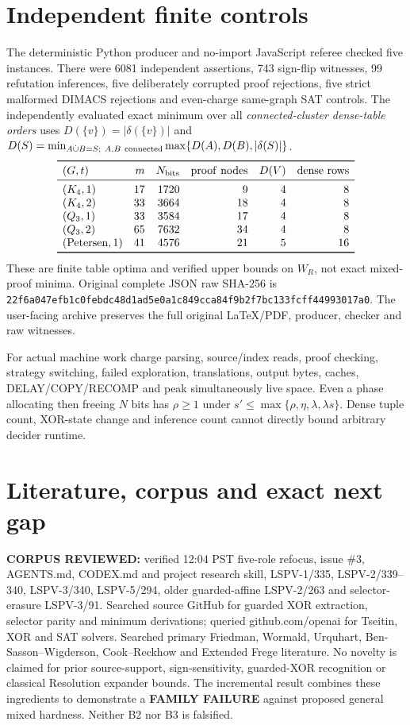 \documentclass[11pt]{article}
\begin{document}
\section{Independent finite controls}
The deterministic Python producer and no-import JavaScript referee checked five instances. There were 6081 independent assertions, 743 sign-flip witnesses, 99 refutation inferences, five deliberately corrupted proof rejections, five strict malformed DIMACS rejections and even-charge same-graph SAT controls. The independently evaluated exact minimum over all \emph{connected-cluster dense-table orders} uses
$D(\{v\})=|\delta(\{v\})|$ and
$D(S)=\min_{A\dot\cup B=S;\ A,B\ {\rm connected}}\max\{D(A),D(B),|\delta(S)|\}$.
\[
\begin{array}{lrrrrr}\toprule
(G,t)&m&N_{\mathrm{bits}}&\mathrm{proof\ nodes}&D(V)&\mathrm{dense\ rows}\\\midrule
(K_4,1)&17&1720&9&4&8\\
(K_4,2)&33&3664&18&4&8\\
(Q_3,1)&33&3584&17&4&8\\
(Q_3,2)&65&7632&34&4&8\\
(\mathrm{Petersen},1)&41&4576&21&5&16\\\bottomrule
\end{array}
\]
These are finite table optima and verified upper bounds on $W_R$, not exact mixed-proof minima. Original complete JSON raw SHA-256 is \texttt{22f6a047efb1c0febdc48d1ad5e0a1c849cca84f9b2f7bc133fcff44993017a0}. The user-facing archive preserves the full original LaTeX/PDF, producer, checker and raw witnesses.

For actual machine work charge parsing, source/index reads, proof checking, strategy switching, failed exploration, translations, output bytes, caches, DELAY/COPY/RECOMP and peak simultaneously live space. Even a phase allocating then freeing $N$ bits has $\rho\ge1$ under $s'\le\max\{\rho,\eta,\lambda,\lambda s\}$. Dense tuple count, XOR-state change and inference count cannot directly bound arbitrary decider runtime.

\section{Literature, corpus and exact next gap}
\textbf{CORPUS REVIEWED:} verified 12:04 PST five-role refocus, issue \#3, AGENTS.md, CODEX.md and project research skill, LSPV-1/335, LSPV-2/339--340, LSPV-3/340, LSPV-5/294, older guarded-affine LSPV-2/263 and selector-erasure LSPV-3/91. Searched source GitHub for guarded XOR extraction, selector parity and minimum derivations; queried github.com/openai for Tseitin, XOR and SAT solvers. Searched primary Friedman, Wormald, Urquhart, Ben-Sasson--Wigderson, Cook--Reckhow and Extended Frege literature. No novelty is claimed for prior source-support, sign-sensitivity, guarded-XOR recognition or classical Resolution expander bounds. The incremental result combines these ingredients to demonstrate a \textbf{FAMILY FAILURE} against proposed general mixed hardness. Neither B2 nor B3 is falsified.
\end{document}
